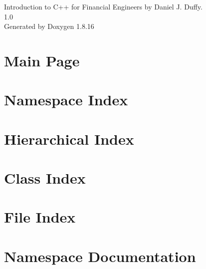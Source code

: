 \let\mypdfximage\pdfximage\def\pdfximage{\immediate\mypdfximage}\documentclass[twoside]{book}
\newcommand{\+}{\discretionary{\mbox{\scriptsize$\hookleftarrow$}}{}{}}
\newcommand{\clearemptydoublepage}{%
  \newpage{\pagestyle{empty}\cleardoublepage}%
}
\begin{document}
\hypersetup{pageanchor=false,
             bookmarksnumbered=true,
             pdfencoding=unicode
            }
\begin{titlepage}
\vspace*{7cm}
\begin{center}%
{\Large Introduction to C++ for Financial Engineers by Daniel J. Duffy. \\[1ex]\large 1.\+0 }\\
\vspace*{1cm}
{\large Generated by Doxygen 1.8.16}\\
\end{center}
\end{titlepage}
\clearemptydoublepage
{}
\tableofcontents
\clearemptydoublepage
{}
\hypersetup{pageanchor=true}

\chapter{Main Page}
\label{index}\hypertarget{index}{}
\chapter{Namespace Index}

\chapter{Hierarchical Index}

\chapter{Class Index}

\chapter{File Index}

\chapter{Namespace Documentation}















\end{document}
